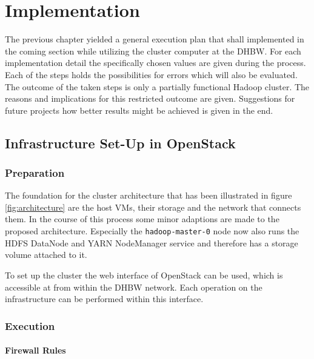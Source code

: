 \chapter{Implementation}
\label{chap:impl}

The previous chapter yielded a general execution plan that shall implemented in the coming 
section while utilizing the cluster computer at the \ac{DHBW}. 
For each implementation detail the specifically chosen values are given during the process. Each of the steps holds 
the possibilities for errors which will also be evaluated.
The outcome of the taken steps is only a partially functional Hadoop cluster.
The reasons and implications for this restricted outcome are given.
Suggestions for future projects how better results might be achieved is given in the end.

\section{Infrastructure Set-Up in OpenStack}

\subsection{Preparation}

The foundation for the cluster architecture that has been illustrated in figure \vref{fig:architecture} are the host \acp{VM}, their storage and the network that connects them.
In the course of this process some minor adaptions are made to the proposed architecture.
Especially the \texttt{hadoop-master-0} node now also runs the \ac{HDFS} DataNode and YARN NodeManager service and therefore has a storage volume attached to it.

To set up the cluster the web interface of OpenStack can be used, which is accessible at
 from within the \ac{DHBW} network.
Each operation on the infrastructure can be performed within this interface.

\subsection{Execution}

\subsubsection{Firewall Rules}

